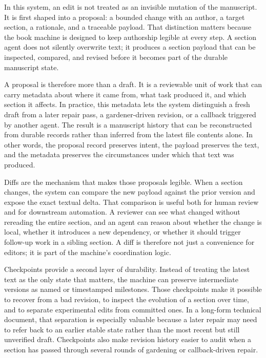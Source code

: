 \documentclass[11pt]{article}
\begin{document}
In this system, an edit is not treated as an invisible mutation of the manuscript. It is first shaped into a proposal: a bounded change with an author, a target section, a rationale, and a traceable payload. That distinction matters because the book machine is designed to keep authorship legible at every step. A section agent does not silently overwrite text; it produces a section payload that can be inspected, compared, and revised before it becomes part of the durable manuscript state.

A proposal is therefore more than a draft. It is a reviewable unit of work that can carry metadata about where it came from, what task produced it, and which section it affects. In practice, this metadata lets the system distinguish a fresh draft from a later repair pass, a gardener-driven revision, or a callback triggered by another agent. The result is a manuscript history that can be reconstructed from durable records rather than inferred from the latest file contents alone. In other words, the proposal record preserves intent, the payload preserves the text, and the metadata preserves the circumstances under which that text was produced.

Diffs are the mechanism that makes those proposals legible. When a section changes, the system can compare the new payload against the prior version and expose the exact textual delta. That comparison is useful both for human review and for downstream automation. A reviewer can see what changed without rereading the entire section, and an agent can reason about whether the change is local, whether it introduces a new dependency, or whether it should trigger follow-up work in a sibling section. A diff is therefore not just a convenience for editors; it is part of the machine's coordination logic.

Checkpoints provide a second layer of durability. Instead of treating the latest text as the only state that matters, the machine can preserve intermediate versions as named or timestamped milestones. Those checkpoints make it possible to recover from a bad revision, to inspect the evolution of a section over time, and to separate experimental edits from committed ones. In a long-form technical document, that separation is especially valuable because a later repair may need to refer back to an earlier stable state rather than the most recent but still unverified draft. Checkpoints also make revision history easier to audit when a section has passed through several rounds of gardening or callback-driven repair.
\end{document}
